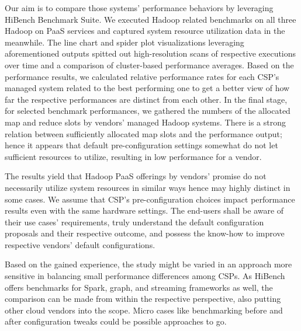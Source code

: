 \documentclass[review]{elsarticle}
\begin{document}
Our aim is to compare those systems' performance behaviors by leveraging HiBench Benchmark Suite. We executed Hadoop related benchmarks on all three Hadoop on PaaS services and captured system resource utilization data in the meanwhile. The line chart and spider plot visualizations leveraging aforementioned outputs spitted out high-resolution scans of respective executions over time and a comparison of cluster-based performance averages. Based on the performance results, we calculated relative performance rates for each CSP's managed system related to the best performing one to get a better view of how far the respective performances are distinct from each other. In the final stage, for selected benchmark performances, we gathered the numbers of the allocated map and reduce slots by vendors' managed Hadoop systems. There is a strong relation between sufficiently allocated map slots and the performance output; hence it appears that default  pre-configuration settings somewhat do not let sufficient resources to utilize, resulting in low performance for a vendor.

The results yield that Hadoop PaaS offerings by vendors' promise do not necessarily utilize system resources in similar ways hence may highly distinct in some cases. We assume that CSP's pre-configuration choices impact performance results even with the same hardware settings. The end-users shall be aware of their use cases' requirements, truly understand the default configuration proposals and their respective outcome, and possess the know-how to improve respective vendors' default configurations.

Based on the gained experience, the study might be varied in an approach more sensitive in balancing small performance differences among CSPs. As HiBench offers benchmarks for Spark, graph, and streaming frameworks as well, the comparison can be made from within the respective perspective, also putting other cloud vendors into the scope. Micro cases like benchmarking before and after configuration tweaks could be possible approaches to go.


\end{document}

